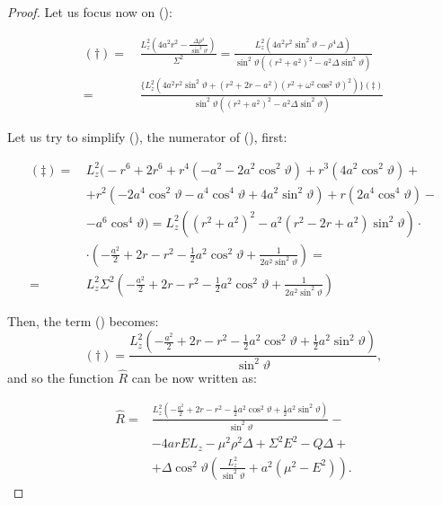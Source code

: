 \begin{proof}
	Let us focus now on (\dag):
	
	\begin{align}
	(\dag) =\,& \frac{L_z^2 \left(4a^2r^2 - \frac{\Delta\rho^4}{\sin^2\vartheta}\right)}{\Sigma^2} = \frac{L_z^2 \left(4a^2r^2\sin^2\vartheta - \rho^4\Delta \right)}{\sin^2\vartheta\left(\left(r^2+a^2\right)^2 - a^2\Delta\sin^2\vartheta\right)} \nonumber \\
	=\,& \frac{\Biggl\{L_z^2\left(4a^2r^2\sin^2\vartheta+\left(r^2+2r-a^2\right)\left(r^2+\omega^2\cos^2\vartheta\right)^2\right)\Biggr\}(\ddag)}{\sin^2\vartheta\left(\left(r^2+a^2\right)^2-a^2\Delta\sin^2\vartheta\right)}
	\end{align}
	
	Let us try to simplify (\ddag), the numerator of (\dag), first:
	
	\begin{align}
	(\ddag) =\,& L_z^2 \Biggl( -r^6 + 2r^6 + r^4 \left( -a^2 - 2a^2\cos^2\vartheta \right) + r^3\left(4 a^2 \cos^2\vartheta \right) + \nonumber \\
	&+ r^2 \left( -2a^4\cos^2\vartheta - a^4\cos^4\vartheta + 4a^2\sin^2\vartheta\right) + r\left(2a^4\cos^4\vartheta\right) - \nonumber \\
	&- a^6\cos^4\vartheta \Biggr) = L_z^2 \left( \left(r^2 + a^2\right)^2 - a^2 \left(r^2 - 2r + a^2\right)\sin^2\vartheta \right) \cdot \nonumber \\
	&\cdot \left( -\frac{a^2}{2} + 2r - r^2 - \frac{1}{2}a^2\cos^2\vartheta + \frac{1}{2a^2\sin^2\vartheta} \right) = \nonumber\\
	=\,& L_z^2 \Sigma^2 \left( -\frac{a^2}{2} + 2r - r^2 - \frac{1}{2}a^2\cos^2\vartheta + \frac{1}{2a^2\sin^2\vartheta} \right)
	\end{align}
	
	Then, the term (\dag) becomes:
	\[
	(\dag) = \frac{L_z^2 \left( -\frac{a^2}{2} + 2r - r^2 - \frac{1}{2}a^2\cos^2\vartheta + \frac{1}{2}a^2\sin^2\vartheta\right) }{\sin^2\vartheta},
	\]
	and so the function $\widehat{R}$ can be now written as:
	
	\begin{align}
	\widehat{R} =& \frac{L_z^2 \left( -\frac{a^2}{2} + 2r - r^2 - \frac{1}{2}a^2\cos^2\vartheta + \frac{1}{2}a^2\sin^2\vartheta\right) }{\sin^2\vartheta} - \nonumber\\
	&- 4 a r E L_z - \mu^2 \rho^2 \Delta + \Sigma^2 E^2 - Q \Delta + \nonumber \\ 
	&+ \Delta\cos^2\vartheta\left(\frac{L_z^2}{\sin^2\vartheta} + a^2\left(\mu^2 - E^2\right)\right).
	\end{align}
	

\end{proof}
